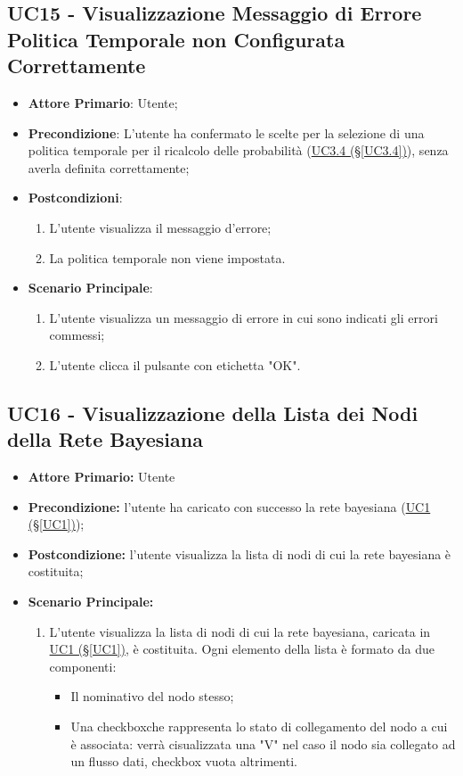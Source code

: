 \pagebreak

\subsection{UC15 - Visualizzazione Messaggio di Errore Politica Temporale non Configurata Correttamente}\label{UC15}
\begin{itemize}
	\item \textbf{Attore Primario}: Utente;
	\item \textbf{Precondizione}: L'utente ha confermato le scelte per la selezione di una politica temporale per il ricalcolo delle probabilità (\hyperref[UC3.4]{UC3.4 (§\ref*{UC3.4})}), senza averla definita correttamente;
	\item \textbf{Postcondizioni}:
	\begin{enumerate}
		\item L'utente visualizza il messaggio d'errore;
		\item La politica temporale non viene impostata.
	\end{enumerate}
	\item \textbf{Scenario Principale}:
	\begin{enumerate}
		\item L'utente visualizza un messaggio di errore in cui sono indicati gli errori commessi;
		\item L'utente clicca il pulsante con etichetta "OK".
	\end{enumerate}
\end{itemize}

\pagebreak

\subsection{UC16 - Visualizzazione della Lista dei Nodi della Rete Bayesiana}\label{UC16}
\begin{itemize}
	\item \textbf{Attore Primario:}  Utente
	\item \textbf{Precondizione:} l'utente ha caricato con successo la rete bayesiana (\hyperref[UC1]{UC1 	(§\ref*{UC1})});
	\item \textbf{Postcondizione:} l'utente visualizza la lista di nodi di cui la rete bayesiana è costituita;
	\item \textbf{Scenario Principale:}
	\begin{enumerate}
		\item L'utente visualizza la lista di nodi di cui la rete bayesiana, caricata in \hyperref[UC1]{UC1 									(§\ref*{UC1})}, è costituita. Ogni elemento della lista è formato da due componenti:
		\begin{itemize}
			\item Il nominativo del nodo stesso;
			\item Una checkbox\glossario che rappresenta lo stato di collegamento del nodo a cui è associata: verrà cisualizzata una "V" nel caso il nodo sia collegato ad un flusso dati, checkbox vuota altrimenti.
		\end{itemize}
	\end{enumerate}
\end{itemize}

